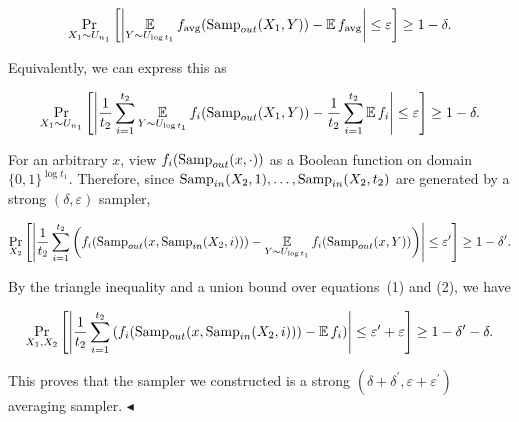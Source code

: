 \documentclass[10pt,a4paper]{article}
\begin{document}
\[\begin{gathered}
\Pr_{X_{1}\sim U_{n_{1}}}\left[\left|\operatorname*{\mathbb{E}}_{Y\sim U_{\log
t_{1}}}{f_{\text{avg}}(\textup{{Samp}}_{out}(X_{1},Y))}-\operatorname*{\mathbb{E}}f_{\text{avg}}\right|\leq{\varepsilon}\right]\geq 1-\delta.
\end{gathered}\]


Equivalently, we can express this as\par


\[\begin{gathered}
\Pr_{X_{1}\sim U_{n_{1}}}\left[\left|\frac{1}{t_{2}}\sum_{i=1}^{t_{2}}\operatorname*{\mathbb{E}}_{Y\sim U_{\log t_{1}}}{f_{i}(\textup{{Samp}}_{out}(X_{1},Y))}-\frac{1}{t_{2}}\sum_{i=1}^{t_{2}}\operatorname*{\mathbb{E}}f_{i}\right|\leq{\varepsilon}\right]\geq 1-\delta.
\end{gathered}\]




For an arbitrary $x$, view $f_{i}(\textup{{Samp}}_{out}(x,\cdot))$ as a Boolean function on domain $\{0,1\}^{\log t_{1}}$. Therefore, since $\textup{{Samp}}_{in}(X_{2},1),\dots,\textup{{Samp}}_{in}(X_{2},t_{2})$ are generated by a strong $(\delta,\varepsilon)$ sampler,\par


\[\begin{gathered}
\Pr_{X_{2}}\left[{\left|\frac{1}{t_{2}}\sum_{i=1}^{t_{2}}\left(f_{i}(\textup{{Samp}}_{out}(x,\textup{{Samp}}_{in}(X_{2},i)))-\operatorname*{\mathbb{E}}_{Y\sim U_{\log t_{1}}}{f_{i}(\textup{{Samp}}_{out}(x,Y))}\right)\right|\leq{\varepsilon^{\prime}}}\right]\geq 1-{\delta^{\prime}}.
\end{gathered}\]




By the triangle inequality and a union bound over equations (1) and (2), we have\par


\[\begin{gathered}
\Pr_{X_{1},X_{2}}\left[\left|\frac{1}{t_{2}}\sum_{i=1}^{t_{2}}\left(f_{i}(\textup{{Samp}}_{out}(x,\textup{{Samp}}_{in}(X_{2},i)))-\operatorname*{\mathbb{E}}f_{i}\right)\right|\leq\varepsilon^{\prime}+\varepsilon\right]\geq 1-\delta^{\prime}-\delta.
\end{gathered}\]


This proves that the sampler we constructed is a strong $(\delta+\delta^{\prime},\varepsilon+\varepsilon^{\prime})$ averaging sampler.
$\blacktriangleleft$\par
\end{document}
